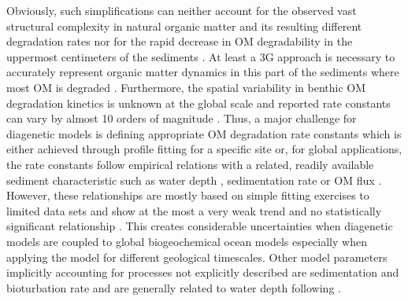 \documentclass[gmd, manuscript]{copernicus}
\begin{document}

Obviously, such simplifications can neither account for the observed vast structural complexity in natural organic matter and its resulting different degradation rates nor for the rapid decrease in 
OM degradability in the uppermost centimeters of the sediments \citep{arndt_quantifying_2013}. At least a 3G approach is necessary to accurately represent organic matter dynamics in this part of the sediments where most OM is 
degraded \citep[e.g.][]{soetaert_model_1996}. 
Furthermore, the spatial variability in benthic OM degradation kinetics is unknown at the global scale and reported rate constants can vary by almost 10 orders of magnitude \citep{arndt_quantifying_2013}.
Thus, a major challenge for diagenetic models is defining appropriate OM degradation rate constants which is either achieved 
through profile fitting for a specific site or, for global applications, the rate constants follow empirical relations with a related, readily available sediment characteristic such as water depth 
\citep{middelburg_empirical_1997}, sedimentation rate \citep{toth_organic_1977, tromp_global_1995} or OM flux \citep{boudreau1997diagenetic}. 
However, these relationships are mostly based on simple fitting exercises to limited data sets and show at the most a very weak trend and no statistically significant relationship \citep{arndt_quantifying_2013}. 
This creates considerable uncertainties when diagenetic models are coupled to global biogeochemical ocean models especially when applying the model for different geological timescales. %
Other model parameters implicitly accounting for processes not explicitly described are sedimentation and bioturbation rate and are generally related to water depth following \citet{middelburg_empirical_1997}.
\end{document}
